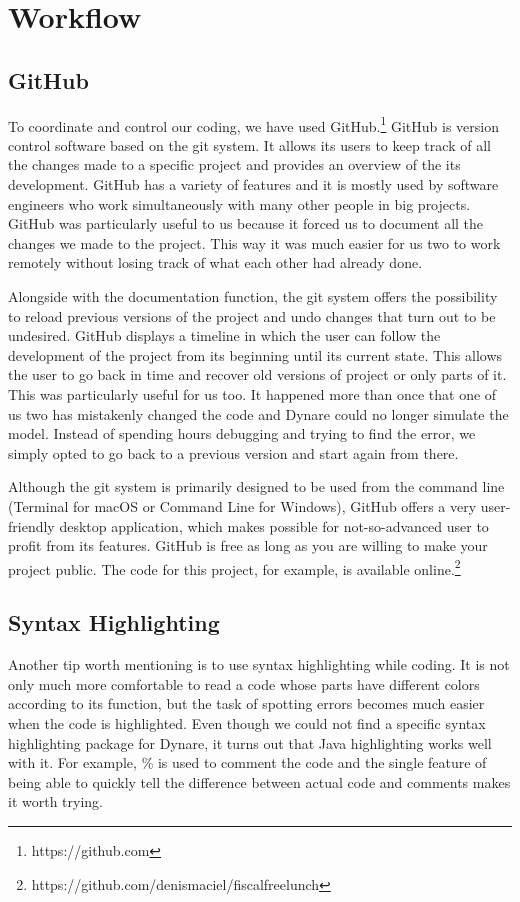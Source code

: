 \section{Workflow}

\subsection*{GitHub}
\label{sub:GitHub}

To coordinate and control our coding, we have used GitHub.\footnote{https://github.com} GitHub is version control software based on the git system. It allows its users to keep track of all the changes made to a specific project and provides an overview of the its development. GitHub has a variety of features and it is mostly used by software engineers who work simultaneously with many other people in big projects. GitHub was particularly useful to us because it forced us to document all the changes we made to the project. This way it was much easier for us two to work remotely without losing track of what each other had already done.
\par
\bigskip
Alongside with the documentation function, the git system offers the possibility to reload previous versions of the project and undo changes that turn out to be undesired. GitHub displays a timeline in which the user can follow the development of the project from its beginning until its current state. This allows the user to go back in time and recover old versions of project or only parts of it. This was particularly useful for us too. It happened more than once that one of us two has mistakenly changed the code and Dynare could no longer simulate the model. Instead of spending hours debugging and trying to find the error, we simply opted to go back to a previous version and start again from there.
\par
\bigskip
Although the git system is primarily designed to be used from the command line (Terminal for macOS or Command Line for Windows), GitHub offers a very user-friendly desktop application, which makes possible for not-so-advanced user to profit from its features. GitHub is free as long as you are willing to make your project public. The code for this project, for example, is available online.\footnote{https://github.com/denismaciel/fiscalfreelunch}


\subsection*{Syntax Highlighting}
\label{sub:Syntax Highlighting}

Another tip worth mentioning is to use syntax highlighting while coding. It is not only much more comfortable to read a code whose parts have different colors according to its function, but the task of spotting errors becomes much easier when the code is highlighted. Even though we could not find a specific syntax highlighting package for Dynare, it turns out that Java highlighting works well with it. For example, \% is used to comment the code and the single feature of being able to quickly tell the difference between actual code and comments makes it worth trying.
